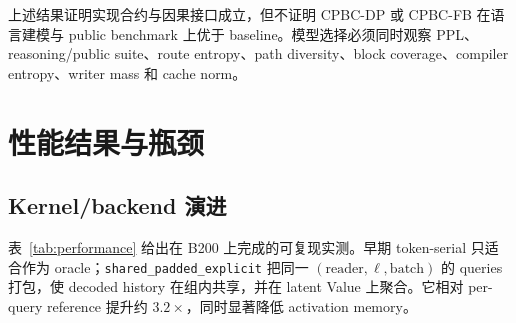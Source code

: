 \documentclass[UTF8,twocolumn,10pt,a4paper]{ctexart}
\newcommand{\DP}{\textsf{CPBC-DP}}
\newcommand{\FB}{\textsf{CPBC-FB}}
\newcommand{\code}[1]{\texttt{#1}}
\begin{document}
上述结果证明实现合约与因果接口成立，但不证明 \DP{} 或 \FB{} 在语言建模与 public benchmark 上优于 baseline。模型选择必须同时观察 PPL、reasoning/public suite、route entropy、path diversity、block coverage、compiler entropy、writer mass 和 cache norm。

\section{性能结果与瓶颈}
\subsection{Kernel/backend 演进}
表~\ref{tab:performance} 给出在 B200 上完成的可复现实测。早期 token-serial 只适合作为 oracle；\code{shared\_padded\_explicit} 把同一 $(\mathrm{reader},\ell,\mathrm{batch})$ 的 queries 打包，使 decoded history 在组内共享，并在 latent Value 上聚合。它相对 per-query reference 提升约 $3.2\times$，同时显著降低 activation memory。
\end{document}
